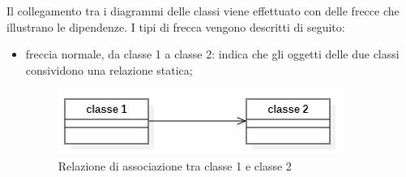 Il collegamento tra i diagrammi delle classi viene effettuato con delle frecce che illustrano le dipendenze.
I tipi di frecca vengono descritti di seguito:
\begin{itemize}
	\item freccia normale, da classe 1 a classe 2: indica che gli oggetti delle due classi consividono una relazione statica;
	\begin{figure}[H]
		\centering\includegraphics{../immagini/normeUML/frecSempl.png}
		\caption{Relazione di associazione tra classe 1 e classe 2}
	\end{figure}
	 

\end{itemize}
